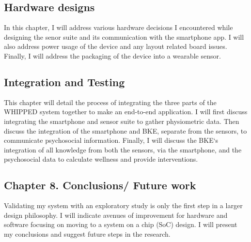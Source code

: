 \subsection{ Hardware designs}
\label{subsec:Chapter5HardwareDesigns}
In this chapter, I will address various hardware decisions I encountered while designing the senor suite and its communication with the smartphone app. I will also address power usage of the device and any layout related board issues. Finally, I will address the packaging of the device into a wearable sensor.

\subsection{ Integration and Testing}
\label{subsec:Chapter6IntegrationAndTesting}
This chapter will detail the process of integrating the three parts of the WHIPPED system together to make an end-to-end application. I will first discuss integrating the smartphone and sensor suite to gather physiometric data. Then discuss the integration of the smartphone and BKE, separate from the sensors, to communicate psychosocial information. Finally, I will discuss the BKE‘s integration of all knowledge from both the sensors, via the smartphone, and the psychosocial data to calculate wellness and provide interventions.
%

\subsection{Chapter 8. Conclusions/ Future work}
\label{subsec:Chapter8Conclusions}
Validating my system with an exploratory study is only the first step in a larger design philosophy. I will indicate avenues of improvement for hardware and software focusing on moving to a system on a chip (SoC) design. I will present my conclusions and suggest future steps in the research.

\fi
